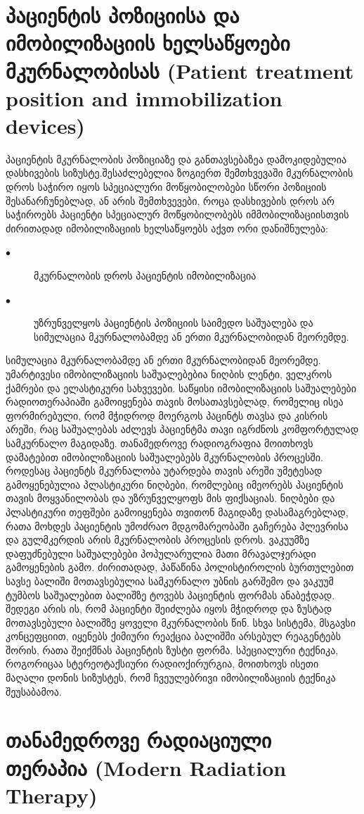 \documentclass[12pt,a4paper,]{report}
\begin{document}
\chapter{პაციენტის პოზიციისა და იმობილიზაციის ხელსაწყოები მკურნალობისას (Patient treatment position and immobilization devices)}
პაციენტის მკურნალობის პოზიციაზე და განთავსებაზეა დამოკიდებულია დასხივების სიზუსტე.შესაძლებელია ზოგიერთ შემთხვევაში მკურნალობის დროს საჭირო იყოს სპეციალური მოწყობილობები სწორი პოზიციის შესანარჩუნებლად, ან არის შემთხვევები, როცა დასხივების დროს არ საჭიროებს პაციენტი სპეციალურ მოწყობილობებს იმმობილიზაციისთვის
ძირითადად იმობილიზაციის ხელსაწყოებს აქვთ ორი დანიშნულება:
	\begin{description}
      \item[$\bullet$] მკურნალობის დროს პაციენტის იმობილიზაცია
      \item[$\bullet$] უზრუნველყოს პაციენტის პოზიციის საიმედო საშუალება და სიმულაცია მკურნალობამდე ან ერთი მკურნალობიდან მეორემდე.
    \end{description}
სიმულაცია მკურნალობამდე ან ერთი მკურნალობიდან მეორემდე.
უმარტივესი იმობილიზაციის საშუალებებია ნიღბის ლენტი, ველკროს ქამრები და ელასტიკური სახვევები.  საწყისი იმობილიზაციის საშუალებები რადიოთერაპიაში გამოიყენება თავის მოსათავსებლად, რომელიც ისეა ფორმირებული, რომ მჭიდროდ მოერგოს პაცინტს თავსა და კისრის არეში, რაც საშუალებას აძლევს პაციენტმა თავი იგრძნოს კომფორტულად სამკურნალო მაგიდაზე. თანამედროვე რადიოგრაფია მოითხოვს დამატებით იმობილიზაციის საშუალებებს მკურნალობის პროცესში. როდესაც პაციენტს მკურნალობა უტარდება თავის არეში უმეტესად გამოყენებულია პლასტიკური ნიღბები, რომლებიც იმეორებს პაციენტის თავის მოყვანილობას და უზრუნველყოფს მის ფიქსაციას.
ნიღბები და პლასტიკური თეფშები გამოიყენება თვითონ მაგიდაზე დასამაგრებლად, რათა მოხდეს პაციენტის უმოძრაო მდგომარეობაში გაჩერება პლევრისა და გულმკერდის არის მკურნალობის პროცესის დროს.
ვაკუუმზე დაფუძნებული საშუალებები პოპულარულია მათი მრავალჯერადი გამოყენების გამო. ძირითადად, პაწაწინა პოლისტიროლის ბურთულებით სავსე ბალიში მოთავსებულია სამკურნალო უბნის გარშემო და ვაკუუმ ტუმბოს საშუალებით ბალიშზე ტოვებს პაციენტის ფორმას ანაბეჭდად. შედეგი არის ის, რომ პაციენტი შეიძლება იყოს მჭიდროდ და ზუსტად მოთავსებული ბალიშზე ყოველი მკურნალობის წინ.
სხვა სისტემა, მსგავსი კონცეფციით, იყენებს ქიმიური რეაქცია ბალიშში არსებულ რეაგენტებს შორის, რათა შეიქმნას პაციენტის ზუსტი ფორმა. სპეციალური ტექნიკა, როგორიცაა სტერეოტაქსიური რადიოქირურგია, მოითხოვს ისეთი მაღალი დონის სიზუსტეს, რომ ჩვეულებრივი იმობილიზაციის ტექნიკა შეუსაბამოა.

\chapter{თანამედროვე რადიაციული თერაპია (Modern Radiation Therapy)}
\end{document}
